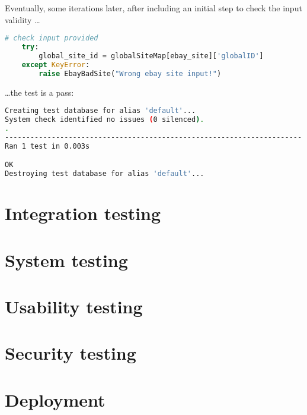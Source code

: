 Eventually, some iterations later, after including an initial step to check the
input validity \ldots
\begin{lstlisting}[language=Python, breaklines=true]
    # check input provided
    try:
        global_site_id = globalSiteMap[ebay_site]['globalID']
    except KeyError:
        raise EbayBadSite("Wrong ebay site input!")
\end{lstlisting}

\ldots the test is a pass:
\begin{lstlisting}[language=bash, breaklines=true]
Creating test database for alias 'default'...
System check identified no issues (0 silenced).
.
----------------------------------------------------------------------
Ran 1 test in 0.003s

OK
Destroying test database for alias 'default'...
\end{lstlisting}

\section{Integration testing}

\section{System testing}

\section{Usability testing}

\section{Security testing}

\section{Deployment}
